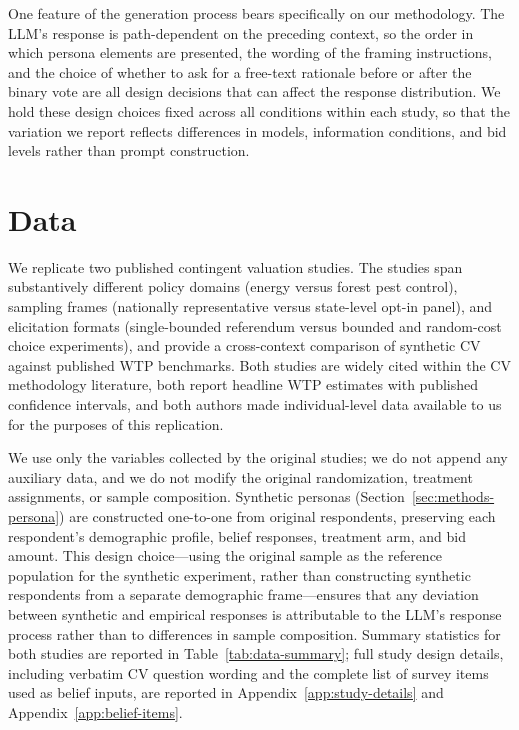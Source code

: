 \documentclass[12pt]{article}
\begin{document}
One feature of the generation process bears specifically on our methodology. The LLM's response is path-dependent on the preceding context, so the order in which persona elements are presented, the wording of the framing instructions, and the choice of whether to ask for a free-text rationale before or after the binary vote are all design decisions that can affect the response distribution. We hold these design choices fixed across all conditions within each study, so that the variation we report reflects differences in models, information conditions, and bid levels rather than prompt construction.


%

\section{Data}\label{sec:data}

We replicate two published contingent valuation studies. The studies span
substantively different policy domains (energy versus forest pest control),
sampling frames (nationally representative versus state-level opt-in panel),
and elicitation formats (single-bounded referendum versus bounded and
random-cost choice experiments), and provide a cross-context comparison of
synthetic CV against published WTP benchmarks. Both studies are widely
cited within the CV methodology literature, both report headline WTP
estimates with published confidence intervals, and both authors made
individual-level data available to us for the purposes of this replication.

We use only the variables collected by the original studies; we do not
append any auxiliary data, and we do not modify the original randomization,
treatment assignments, or sample composition. Synthetic personas
(Section~\ref{sec:methods-persona}) are constructed one-to-one from
original respondents, preserving each respondent's demographic profile,
belief responses, treatment arm, and bid amount. This design choice---using
the original sample as the reference population for the synthetic
experiment, rather than constructing synthetic respondents from a separate
demographic frame---ensures that any deviation between synthetic and
empirical responses is attributable to the LLM's response process rather
than to differences in sample composition. Summary statistics for both
studies are reported in Table~\ref{tab:data-summary}; full study design
details, including verbatim CV question wording and the complete list of
survey items used as belief inputs, are reported in
Appendix~\ref{app:study-details} and Appendix~\ref{app:belief-items}.
\end{document}
